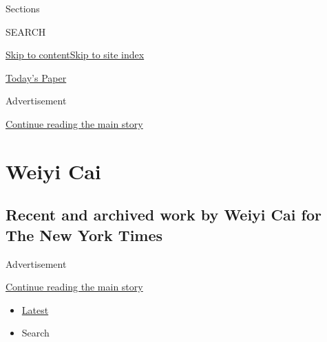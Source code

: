 Sections

SEARCH

\protect\hyperlink{site-content}{Skip to
content}\protect\hyperlink{site-index}{Skip to site index}

\href{https://myaccount.nytimes.com/auth/login?response_type=cookie\&client_id=vi}{}

\href{https://www.nytimes.com/section/todayspaper}{Today's Paper}

Advertisement

\protect\hyperlink{after-top}{Continue reading the main story}

\hypertarget{weiyi-cai}{%
\section{Weiyi Cai}\label{weiyi-cai}}

\hypertarget{recent-and-archived-work-by-weiyi-cai-for-the-new-york-times}{%
\subsection{Recent and archived work by Weiyi Cai for The New York
Times}\label{recent-and-archived-work-by-weiyi-cai-for-the-new-york-times}}

Advertisement

\protect\hyperlink{after-mid1}{Continue reading the main story}

\begin{itemize}
\tightlist
\item
  \protect\hyperlink{stream-panel}{Latest}
\item
  Search
\end{itemize}

